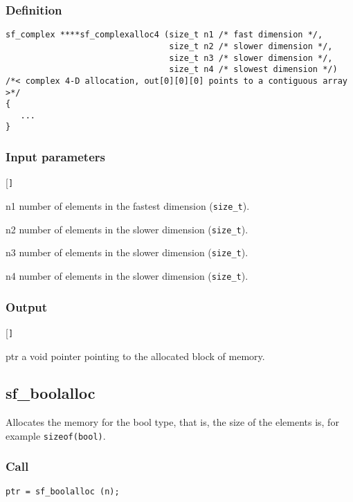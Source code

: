 \subsubsection*{Definition}
\begin{verbatim}
sf_complex ****sf_complexalloc4 (size_t n1 /* fast dimension */, 
                                 size_t n2 /* slower dimension */, 
                                 size_t n3 /* slower dimension */, 
                                 size_t n4 /* slowest dimension */)
/*< complex 4-D allocation, out[0][0][0] points to a contiguous array >*/ 
{
   ...
}
\end{verbatim}

\subsubsection*{Input parameters}
\begin{desclist}{\tt }{\quad}[\tt ]
   \setlength\itemsep{0pt}
   \item[n1] number of elements in the fastest dimension (\texttt{size\_t}).
   \item[n2] number of elements in the slower dimension (\texttt{size\_t}).
   \item[n3] number of elements in the slower dimension (\texttt{size\_t}).
   \item[n4] number of elements in the slower dimension (\texttt{size\_t}).
\end{desclist}

\subsubsection*{Output}
\begin{desclist}{\tt }{\quad}[\tt ]
   \setlength\itemsep{0pt}
   \item[ptr] a void pointer pointing to the allocated block of memory.
\end{desclist}




\subsection{{sf\_boolalloc}}\label{sec:sf_boolalloc}
Allocates the memory for  the bool type, that is,  the size of the elements is, for example \texttt{sizeof(bool)}. 

\subsubsection*{Call}
\begin{verbatim}ptr = sf_boolalloc (n);\end{verbatim}


